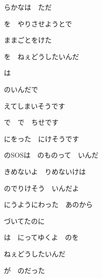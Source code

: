 \documentclass[a4paper,tate,twocolumn,12pt]{ltjtarticle}
\begin{document}
\begin{flushleft}
\noindent\begin{minipage}{\linewidth}
らかなは　ただ

を　やりさせようとで

ままごとをけた

を　ねぇどうしたいんだ

は　
\end{minipage}

\vspace{2em}

\noindent\begin{minipage}{\linewidth}
のいんだで

えてしまいそうです

で　で　ちせです

にをった　にけそうです

のSOSは　のものって　いんだ
\end{minipage}

\vspace{2em}

\noindent\begin{minipage}{\linewidth}
きめないよ　りめないけは

のでりけそう　いんだよ

にうようにわった　あのから

づいてたのに

は　にってゆくよ　のを
\end{minipage}

\vspace{2em}

\noindent\begin{minipage}{\linewidth}
ねぇどうしたいんだ

が　のだった
\end{minipage}


\end{flushleft}
\end{document}
